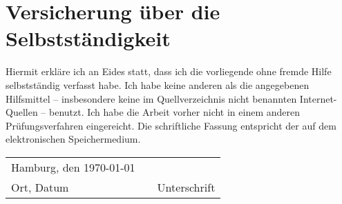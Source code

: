 
\chapter*{Versicherung über die Selbstständigkeit}
 
\thispagestyle{empty}

Hiermit erkläre ich an Eides statt, dass ich die vorliegende \thesistype{} ohne fremde Hilfe selbstständig verfasst habe. Ich habe keine anderen als die angegebenen Hilfsmittel -- insbesondere keine im Quellverzeichnis nicht benannten Internet-Quellen -- benutzt. Ich habe die Arbeit vorher nicht in einem anderen Prüfungsverfahren eingereicht. Die schriftliche Fassung entspricht der auf dem elektronischen Speichermedium. \\[2cm]

\begin{tabularx}{\linewidth}{X l X}
	Hamburg, den \today & \hspace*{2cm} & \\
      \cline{1-1}
      \cline{3-3}
      Ort, Datum   &  & Unterschrift \\  %
\end{tabularx}

